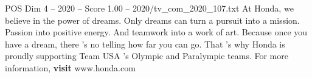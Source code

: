 \begin{textsample}{POS Dim 4 – 2020 – Score 1.00 – 2020/tv\_com\_2020\_107.txt}  \label{ex:f4_pos_045}
At Honda, we believe in the power of dreams.
Only dreams can turn a pursuit into a mission.
Passion into positive energy.
And teamwork into a work of art.
Because once you have a dream, there 's no telling how far you can go.
That 's why Honda is proudly supporting Team USA 's Olympic and Paralympic teams.
For more information, \textbf{visit} www.honda.com

\end{textsample}

